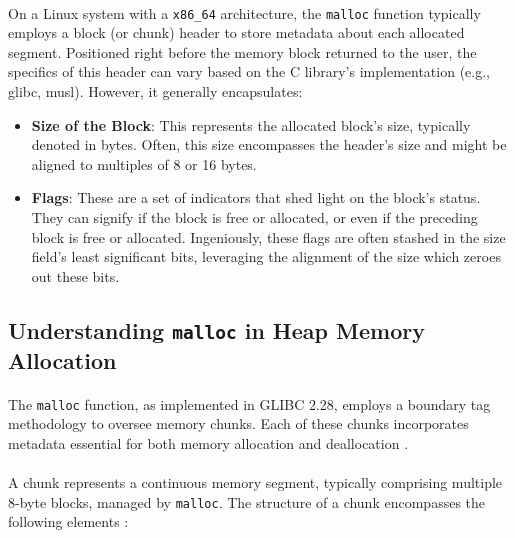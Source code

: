        \paragraph{}On a Linux system with a \texttt{x86\_64} architecture, the \lstinline[language=c]|malloc| function typically employs a block (or \gls{chunk}) header to store metadata about each allocated segment. Positioned right before the memory block returned to the user, the specifics of this header can vary based on the C library's implementation (e.g., glibc, musl). However, it generally encapsulates:

        \begin{itemize}
            \item \textbf{Size of the Block}: This represents the allocated block's size, typically denoted in bytes. Often, this size encompasses the header's size and might be aligned to multiples of 8 or 16 bytes.
            \item \textbf{Flags}: These are a set of indicators that shed light on the block's status. They can signify if the block is free or allocated, or even if the preceding block is free or allocated. Ingeniously, these flags are often stashed in the size field's least significant bits, leveraging the alignment of the size which zeroes out these bits.
        \end{itemize}

    \subsection{Understanding \texttt{malloc} in Heap Memory Allocation}

        \paragraph{}The \texttt{malloc} function, as implemented in GLIBC 2.28, employs a boundary tag methodology to oversee memory \glspl{chunk}. Each of these \glspl{chunk} incorporates metadata essential for both memory allocation and deallocation \cite{gloger_malloc_2001} \cite{delorie_malloc_2023}. 
        
        \paragraph{}A \gls{chunk} represents a continuous memory segment, typically comprising multiple 8-byte blocks, managed by \texttt{malloc}. The structure of a \gls{chunk} encompasses the following elements \cite{delorie_malloc_2023} \cite{unknown_how_2023}:
        
